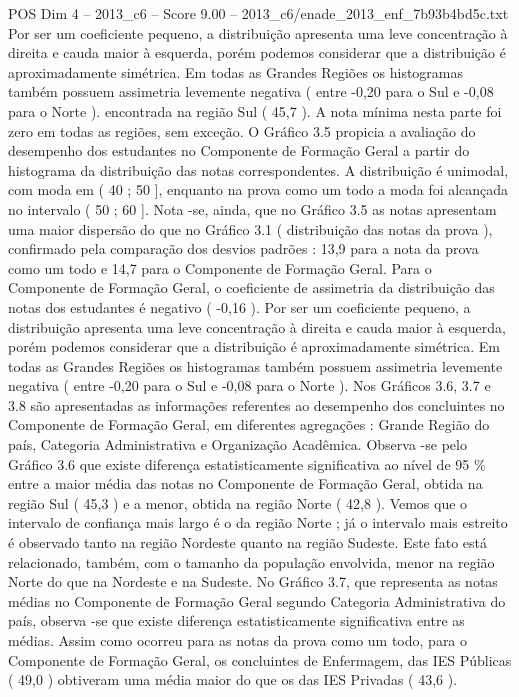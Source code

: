 \begin{textsample}{POS Dim 4 – 2013\_c6 – Score 9.00 – 2013\_c6/enade\_2013\_enf\_7b93b4bd5c.txt}
Por ser um coeficiente pequeno, a distribuição apresenta uma leve concentração à direita e cauda maior à esquerda, porém podemos considerar que a distribuição é aproximadamente simétrica.
Em todas as Grandes Regiões os histogramas também possuem assimetria levemente negativa ( entre -0,20 para o Sul e -0,08 para o Norte ). encontrada na região Sul ( 45,7 ).
A nota mínima nesta parte foi zero em todas as regiões, sem exceção.
O Gráfico 3.5 propicia a avaliação do desempenho dos estudantes no Componente de Formação Geral a partir do histograma da distribuição das notas correspondentes.
A distribuição é unimodal, com moda em ( 40 ; 50 ], enquanto na prova como um todo a moda foi alcançada no intervalo ( 50 ; 60 ].
Nota -se, ainda, que no Gráfico 3.5 as notas apresentam uma maior dispersão do que no Gráfico 3.1 ( distribuição das notas da prova ), confirmado pela comparação dos desvios padrões : 13,9 para a nota da prova como um todo e 14,7 para o Componente de Formação Geral.
Para o Componente de Formação Geral, o coeficiente de assimetria da distribuição das notas dos estudantes é negativo ( -0,16 ).
Por ser um coeficiente pequeno, a distribuição apresenta uma leve concentração à direita e cauda maior à esquerda, porém podemos considerar que a distribuição é aproximadamente simétrica.
Em todas as Grandes Regiões os histogramas também possuem assimetria levemente negativa ( entre -0,20 para o Sul e -0,08 para o Norte ).
Nos Gráficos 3.6, 3.7 e 3.8 são apresentadas as informações referentes ao desempenho dos concluintes no Componente de Formação Geral, em diferentes agregações : Grande Região do país, Categoria Administrativa e Organização Acadêmica.
Observa -se pelo Gráfico 3.6 que existe diferença estatisticamente significativa ao nível de 95 \% entre a maior média das notas no Componente de Formação Geral, obtida na região Sul ( 45,3 ) e a menor, obtida na região Norte ( 42,8 ).
Vemos que o intervalo de confiança mais largo é o da região Norte ; já o intervalo mais estreito é observado tanto na região Nordeste quanto na região Sudeste.
Este fato está relacionado, também, com o tamanho da população envolvida, menor na região Norte do que na Nordeste e na Sudeste.
No Gráfico 3.7, que representa as notas médias no Componente de Formação Geral segundo Categoria Administrativa do país, observa -se que existe diferença estatisticamente significativa entre as médias.
Assim como ocorreu para as notas da prova como um todo, para o Componente de Formação Geral, os concluintes de Enfermagem, das IES Públicas ( 49,0 ) obtiveram uma média maior do que os das IES Privadas ( 43,6 ).

\end{textsample}
